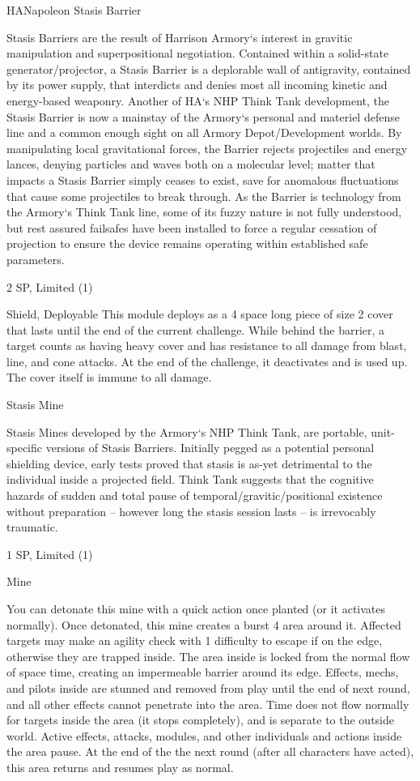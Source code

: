 \begin{mech}{HA}{Napoleon}
Stasis Barrier

Stasis Barriers are the result of Harrison Armory‘s interest in gravitic manipulation and superpositional negotiation. Contained within a solid-state generator/projector, a Stasis Barrier is a deplorable wall of antigravity, contained by its power supply, that interdicts and denies most all incoming kinetic and energy-based weaponry. Another of HA‘s NHP Think Tank development, the Stasis Barrier is now a mainstay of the Armory‘s personal and materiel defense line and a common enough sight on all Armory Depot/Development worlds. By manipulating local gravitational forces, the Barrier rejects projectiles and energy lances, denying particles and waves both on a molecular level; matter that impacts a Stasis Barrier simply ceases to exist, save for anomalous fluctuations that cause some projectiles to break through. As the Barrier is technology from the Armory‘s Think Tank line, some of its fuzzy nature is not fully understood, but rest assured failsafes have been installed to force a regular cessation of projection to ensure the device remains operating within established safe parameters.

2 SP, Limited (1)

Shield, Deployable
This module deploys as a 4 space long piece of size 2 cover that lasts until the end of the current challenge. While behind the barrier, a target counts as having heavy cover and has resistance to all damage from blast, line, and cone attacks. At the end of the challenge, it deactivates and is used up. The cover itself is immune to all damage.


Stasis Mine

Stasis Mines developed by the Armory‘s NHP Think Tank, are portable, unit-specific versions of Stasis Barriers. Initially pegged as a potential personal shielding device, early tests proved that stasis is as-yet detrimental to the individual inside a projected field. Think Tank suggests that the cognitive hazards of sudden and total pause of temporal/gravitic/positional existence without preparation -- however long the stasis session lasts -- is irrevocably traumatic.

1 SP,  Limited (1)


Mine

You can detonate this mine with a quick action once planted (or it activates normally). Once detonated, this mine creates a burst 4 area around it. Affected targets may make an agility check with 1 difficulty to escape if on the edge, otherwise they are trapped inside. The area inside is locked from the normal flow of space time, creating an impermeable barrier around its edge. Effects, mechs, and pilots inside are stunned and removed from play until the end of next round, and all other effects cannot penetrate into the area. Time does not flow normally for targets inside the area (it stops completely), and is separate to the outside world. Active effects, attacks, modules, and other individuals and actions inside the area pause. At the end of the the next round (after all characters have acted), this area returns and resumes play as normal.



\end{mech}
